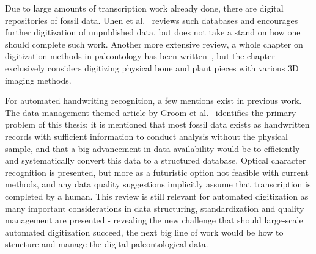 \documentclass[english,twoside,openright]{UH_DS_MSc}
\begin{document}
Due to large amounts of transcription work already done, there are digital repositories of fossil data.
Uhen et al.~\cite{uhenCardCatalogsComputers2013} reviews such databases and encourages further 
digitization of unpublished data, but does not take a stand on how one should complete such work.
Another more extensive review, a whole chapter on digitization methods in paleontology has been written~\cite{mallisonDigitizingMethodsPaleontology2011},
but the chapter exclusively considers digitizing physical bone and plant pieces with various 3D imaging methods.

For automated handwriting recognition, a few mentions exist in previous work. The data management themed 
article by Groom et al.~\cite{groomImprovedStandardizationTranscribed2019} identifies the primary 
problem of this thesis: it is mentioned that most fossil data exists as handwritten records with sufficient information 
to conduct analysis without the physical sample, and that a big advancement in data availability would be to efficiently and 
systematically convert this data to a structured database. Optical character recognition is presented, but more as a futuristic option 
not feasible with current methods, and any data quality suggestions implicitly assume that transcription is completed 
by a human. This review is still relevant for automated digitization as many important considerations in data structuring,
standardization and quality management are presented - revealing the new challenge that should large-scale automated digitization succeed,
the next big line of work would be how to structure and manage the digital paleontological data.
\end{document}
